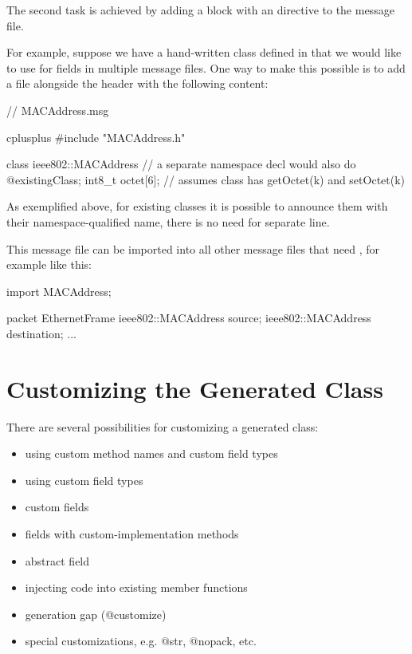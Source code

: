 The second task is achieved by adding a  block with
an  directive to the message file.

For example, suppose we have a hand-written  class
defined in  that we would like to use for fields in multiple
message files. One way to make this possible is to add a 
file alongside the header with the following content:

\begin{msg}
// MACAddress.msg

cplusplus {{
#include "MACAddress.h"
}}

class ieee802::MACAddress  // a separate namespace decl would also do
{
    @existingClass;
    int8_t octet[6]; // assumes class has getOctet(k) and setOctet(k)
}
\end{msg}

As exemplified above, for existing classes it is possible to announce
them with their namespace-qualified name, there is no need for separate
 line.

This message file can be imported into all other message files that need
, for example like this:

\begin{msg}
import MACAddress;

packet EthernetFrame {
    ieee802::MACAddress source;
    ieee802::MACAddress destination;
    ...
}
\end{msg}


\section{Customizing the Generated Class}
\label{sec:msg-defs:customizing-generated-class}

There are several possibilities for customizing a generated class:

\begin{itemize}
  \item using custom method names and custom field types
  \item using custom field types
  \item custom fields
  \item fields with custom-implementation methods
  \item abstract field
  \item injecting code into existing member functions
  \item generation gap (@customize)
  \item special customizations, e.g. @str, @nopack, etc.
\end{itemize}

